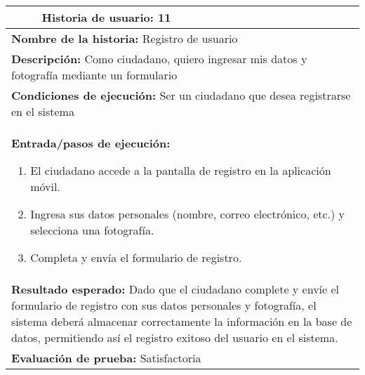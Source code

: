 \begin{longtable}{|p{6.7cm}|p{6.7cm}|}
    \hline
    \endlastfoot
    \multicolumn{1}{|p{6.7cm}|}{\textbf{Número} 11 } & \multicolumn{1}{|p{6.7cm}|}{\textbf{Historia de usuario:} 11}                                                                                                                                                                                                \\
    \hline
    \multicolumn{2}{|p{13.4cm}|}{\textbf{Nombre de la historia:} Registro de usuario }                                                                                                                                                                                                                              \\
    \hline
    \multicolumn{2}{|p{13.4cm}|}{\textbf{Descripción:} Como ciudadano, quiero ingresar mis datos y fotografía mediante un formulario}                                                                                                                                                                               \\
    \hline
    \multicolumn{2}{|p{13.4cm}|}{\textbf{Condiciones de ejecución:} Ser un ciudadano que desea registrarse en el sistema}                                                                                                                                                                                           \\
    \hline
    \multicolumn{2}{|p{13.4cm}|}{\textbf{Entrada/pasos de ejecución:}
    \begin{enumerate}[label=\arabic*.]
        \item El ciudadano accede a la pantalla de registro en la aplicación móvil.
        \item Ingresa sus datos personales (nombre, correo electrónico, etc.) y selecciona una fotografía.
        \item Completa y envía el formulario de registro.
    \end{enumerate}
    }                                                                                                                                                                                                                                                                                                               \\
    \hline
    \multicolumn{2}{|p{13.4cm}|}{\textbf{Resultado esperado:} Dado que el ciudadano complete y envíe el formulario de registro con sus datos personales y fotografía, el sistema deberá almacenar correctamente la información en la base de datos, permitiendo así el registro exitoso del usuario en el sistema.} \\
    \hline
    \multicolumn{2}{|p{13.4cm}|}{\textbf{Evaluación de prueba:} Satisfactoria}                                                                                                                                                                                                                                      \\
    \hline
\end{longtable}


